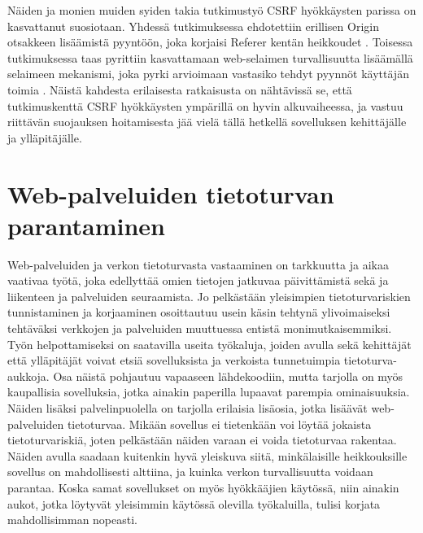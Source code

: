 Näiden ja monien muiden syiden takia tutkimustyö CSRF hyökkäysten parissa on kasvattanut suosiotaan. Yhdessä tutkimuksessa ehdotettiin erillisen Origin
otsakkeen lisäämistä pyyntöön, joka korjaisi Referer kentän heikkoudet \cite{CSRF}. Toisessa tutkimuksessa taas pyrittiin kasvattamaan web-selaimen turvallisuutta
lisäämällä selaimeen mekanismi, joka pyrki arvioimaan vastasiko tehdyt pyynnöt käyttäjän toimia \cite{CSRFb}. Näistä kahdesta erilaisesta ratkaisusta on nähtävissä se,
että tutkimuskenttä CSRF hyökkäysten ympärillä on hyvin alkuvaiheessa, ja vastuu riittävän suojauksen hoitamisesta jää vielä tällä hetkellä 
sovelluksen kehittäjälle ja ylläpitäjälle.

\section{Web-palveluiden tietoturvan parantaminen}

Web-palveluiden ja verkon tietoturvasta vastaaminen on tarkkuutta ja aikaa vaativaa työtä, joka edellyttää omien tietojen jatkuvaa päivittämistä sekä ja liikenteen ja palveluiden
seuraamista. Jo pelkästään yleisimpien tietoturvariskien tunnistaminen ja korjaaminen osoittautuu usein käsin tehtynä ylivoimaiseksi tehtäväksi verkkojen ja palveluiden
muuttuessa entistä monimutkaisemmiksi. Työn helpottamiseksi on saatavilla useita työkaluja, joiden avulla sekä kehittäjät että ylläpitäjät voivat
etsiä sovelluksista ja verkoista tunnetuimpia tietoturva-aukkoja. Osa näistä pohjautuu vapaaseen lähdekoodiin, mutta tarjolla on myös kaupallisia sovelluksia, jotka ainakin 
paperilla lupaavat parempia ominaisuuksia. Näiden lisäksi palvelinpuolella on tarjolla erilaisia lisäosia, jotka lisäävät web-palveluiden tietoturvaa. 
Mikään sovellus ei tietenkään voi löytää jokaista tietoturvariskiä, joten pelkästään näiden varaan ei voida tietoturvaa rakentaa. Näiden avulla 
saadaan kuitenkin hyvä yleiskuva siitä, minkälaisille heikkouksille sovellus on mahdollisesti alttiina, ja kuinka verkon turvallisuutta voidaan parantaa. Koska samat 
sovellukset on myös hyökkääjien käytössä, niin ainakin aukot, jotka löytyvät yleisimmin käytössä olevilla työkaluilla, tulisi korjata mahdollisimman nopeasti. 

